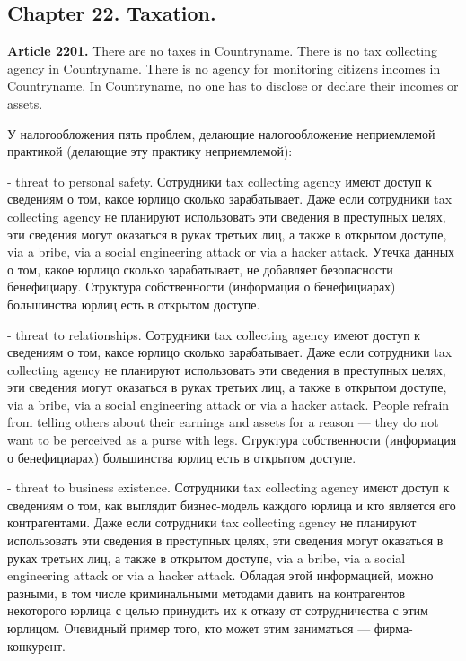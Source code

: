 \documentclass[11pt]{article}
\theoremstyle{remark}
\theoremstyle{definition}
\begin{document}
\color{black}

\subsection*{Chapter 22. Taxation.}




\textbf{Article 2201.} There are no taxes in Countryname. There is no tax collecting agency in Countryname. There is no agency for monitoring citizens incomes in Countryname. In Countryname, no one has to disclose or declare their incomes or assets. 

\color{blue}




У налогообложения пять проблем, делающие налогообложение неприемлемой практикой (делающие эту практику неприемлемой):

- threat to personal safety. Сотрудники tax collecting agency имеют доступ к сведениям о том, какое юрлицо сколько зарабатывает. Даже если сотрудники tax collecting agency не планируют использовать эти сведения в преступных целях, эти сведения могут оказаться в руках третьих лиц, а также в открытом доступе, via a bribe, via a social engineering attack or via a hacker attack. Утечка данных о том, какое юрлицо сколько зарабатывает, не добавляет безопасности бенефициару. Структура собственности (информация о бенефициарах) большинства юрлиц есть в открытом доступе.

- threat to relationships. Сотрудники tax collecting agency имеют доступ к сведениям о том, какое юрлицо сколько зарабатывает. Даже если сотрудники tax collecting agency не планируют использовать эти сведения в преступных целях, эти сведения могут оказаться в руках третьих лиц, а также в открытом доступе, via a bribe, via a social engineering attack or via a hacker attack. People refrain from telling others about their earnings and assets for a reason --- they do not want to be perceived as a purse with legs. Структура собственности (информация о бенефициарах) большинства юрлиц есть в открытом доступе.

- threat to business existence. Сотрудники tax collecting agency имеют доступ к сведениям о том, как выглядит бизнес-модель каждого юрлица и кто является его контрагентами. Даже если сотрудники tax collecting agency не планируют использовать эти сведения в преступных целях, эти сведения могут оказаться в руках третьих лиц, а также в открытом доступе, via a bribe, via a social engineering attack or via a hacker attack. Обладая этой информацией, можно разными, в том числе криминальными методами давить на контрагентов некоторого юрлица с целью принудить их к отказу от сотрудничества с этим юрлицом. Очевидный пример того, кто может этим заниматься --- фирма-конкурент.
\end{document}
